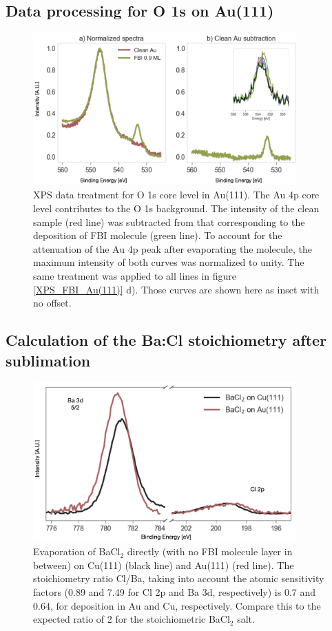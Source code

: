 \documentclass[aps,prl,reprint,longbibliography,superscriptaddress]{revtex4-1}
\def\BaCl{BaCl$_2$ }
\begin{document}
\subsection{Data processing for O 1s on Au(111)}
\begin{figure}[ht!]
	\includegraphics[width=0.9\textwidth]{figures/si_au_subtraction.png}
	\caption{\label{Au_subtraction} 
    XPS data treatment for O 1s core level in Au(111). The Au 4p core level contributes to the O 1s background. The intensity of the clean sample (red line) was subtracted from that corresponding to the deposition of FBI molecule (green line). To account for the attenuation of the Au 4p peak after evaporating the molecule, the maximum intensity of both curves was normalized to unity. The same treatment was applied to all lines in figure \ref{XPS_FBI_Au(111)} d). Those curves are shown here as inset with no offset.}
\end{figure}  

\subsection{Calculation of the Ba:Cl stoichiometry after sublimation}

\begin{figure}[ht!]
	\includegraphics[width=0.9\textwidth]{figures/si_bacl_au_cu.png}
	\caption{\label{Chlorine_desorption} 
    Evaporation of \BaCl directly (with no FBI molecule layer in between) on Cu(111) (black line) and Au(111) (red line). The stoichiometry ratio Cl/Ba, taking into account the atomic sensitivity factors (0.89 and 7.49 for Cl 2p and Ba 3d, respectively) is 0.7 and 0.64, for deposition in Au and Cu, respectively. Compare this to the expected ratio of 2 for the stoichiometric \BaCl salt.}
\end{figure}  
\end{document}
